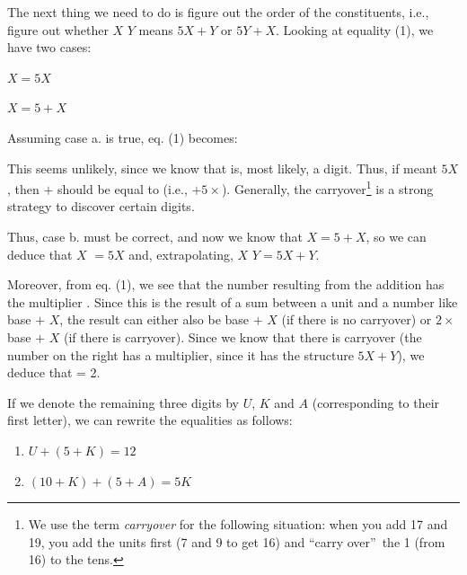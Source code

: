 \begin{refsection}
\begin{mysolution}
The next thing we need to do is figure out the order of the constituents, i.e., figure out whether $X$  $Y$ means $5X + Y$ or $5Y + X$. Looking at equality (1), we have two cases:


\begin{enumerate}[label = \alph*.]
\begin{multicols}{2}
    \item {} $X = 5X$
    \item {} $X = 5+X$
    \end{multicols}
\end{enumerate}


 Assuming case a. is true, eq. (1) becomes:


 This seems unlikely, since we know that  is, most likely, a digit. Thus, if  meant $5X$, then  $+$  should be equal to  (i.e.,  $+ 5\times$). Generally, the carryover\footnote{We use the term \textit{carryover} for the following situation: when you add 17 and 19, you add the units first (7 and 9 to get 16) and “carry over”\ the 1 (from 16) to the tens.} is a strong strategy to discover certain digits.

Thus, case b. must be correct, and now we know that  $X = 5 + X$, so we can deduce that $X$  $= 5X$ and, extrapolating, $X$  $Y = 5X + Y$.

Moreover, from eq. (1), we see that the number resulting from the addition has the multiplier . Since this is the result of a sum between a unit and a number like base $+$ $X$, the result can either also be base $+$ $X$ (if there is no carryover) or $2\times$base $+$ $X$ (if there is carryover). Since we know that there is carryover (the number on the right has a multiplier, since it has the structure $5X+Y$), we deduce that  = 2.

If we denote the remaining three digits by $U$, $K$ and $A$ (corresponding to their first letter), we can rewrite the equalities as follows:
\begin{enumerate}[leftmargin = 5em, label = (\arabic*)]
    \item $U+(5+K)=12$
    \item $(10+K)+(5+A)=5K$
\end{enumerate}


\end{mysolution}
\end{refsection}
